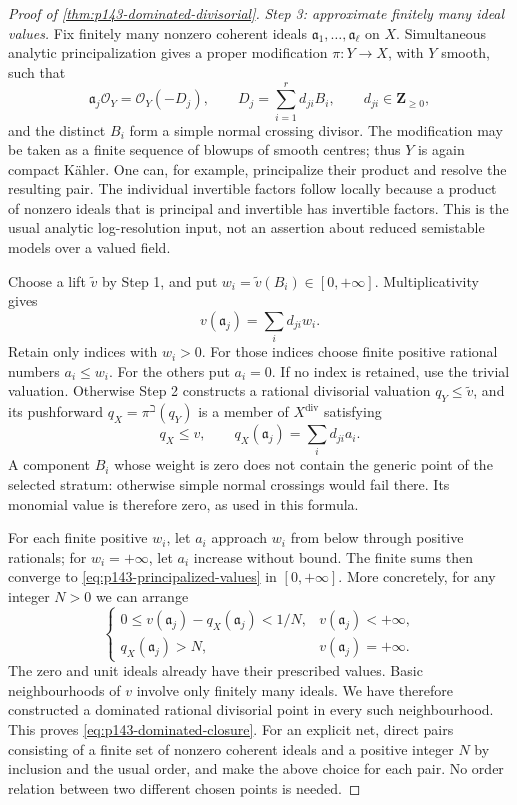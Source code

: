 \begin{proof}[Proof of \cref{thm:p143-dominated-divisorial}]
\medskip\noindent
\emph{Step 3: approximate finitely many ideal values.}
Fix finitely many nonzero coherent ideals
\(\mathfrak a_1,\ldots,\mathfrak a_\ell\) on \(X\).
Simultaneous analytic principalization gives a proper modification
\(\pi:Y\to X\), with \(Y\) smooth, such that
\[
 \mathfrak a_j\mathcal O_Y=\mathcal O_Y(-D_j),\qquad
 D_j=\sum_{i=1}^r d_{ji}B_i,\qquad d_{ji}\in\mathbf Z_{\geq0},
\]
and the distinct \(B_i\) form a simple normal crossing divisor.
The modification may be taken as a finite sequence of blowups of
smooth centres; thus \(Y\) is again compact K\"ahler.
One can, for example, principalize their product and resolve the
resulting pair. The individual invertible factors follow locally
because a product of nonzero ideals that is principal and invertible
has invertible factors. This is the usual analytic log-resolution
input, not an assertion about reduced semistable models over a
valued field.

Choose a lift \(\widetilde v\) by Step 1, and put
\(w_i=\widetilde v(B_i)\in[0,+\infty]\). Multiplicativity gives
\begin{equation}
                         v(\mathfrak a_j)=\sum_i d_{ji}w_i.
 \label{eq:p143-principalized-values}
\end{equation}
Retain only indices with \(w_i>0\). For those indices choose finite
positive rational numbers \(a_i\leq w_i\). For the others put \(a_i=0\).
If no index is retained, use the trivial valuation. Otherwise Step 2
constructs a rational divisorial valuation \(q_Y\leq\widetilde v\),
and its pushforward \(q_X=\pi^\beth(q_Y)\) is a member of
\(X^{\mathrm{div}}\) satisfying
\[
            q_X\leq v,\qquad
            q_X(\mathfrak a_j)=\sum_i d_{ji}a_i .
\]
A component \(B_i\) whose weight is zero does not contain the generic
point of the selected stratum: otherwise simple normal crossings
would fail there. Its monomial value is therefore zero, as used in
this formula.

For each finite positive \(w_i\), let \(a_i\) approach \(w_i\) from
below through positive rationals; for \(w_i=+\infty\), let \(a_i\)
increase without bound. The finite sums then converge to
\eqref{eq:p143-principalized-values} in \([0,+\infty]\).
More concretely, for any integer \(N>0\) we can arrange
\[
 \begin{cases}
 0\leq v(\mathfrak a_j)-q_X(\mathfrak a_j)<1/N,
       &v(\mathfrak a_j)<+\infty,\\
 q_X(\mathfrak a_j)>N,&v(\mathfrak a_j)=+\infty .
 \end{cases}
\]
The zero and unit ideals already have their prescribed values.
Basic neighbourhoods of \(v\) involve only finitely many ideals.
We have therefore constructed a dominated rational divisorial point
in every such neighbourhood. This proves
\eqref{eq:p143-dominated-closure}.
For an explicit net, direct pairs consisting of a finite set of
nonzero coherent ideals and a positive integer \(N\) by inclusion
and the usual order, and make the above choice for each pair.
No order relation between two different chosen points is needed.
\end{proof}

